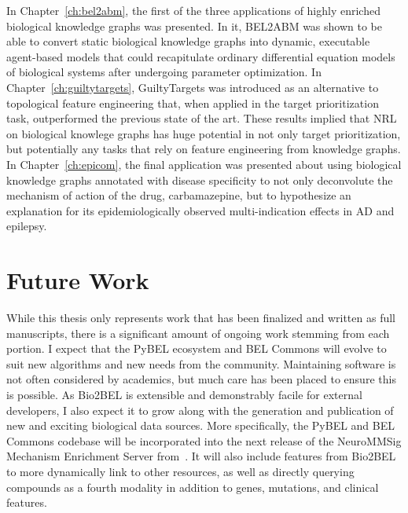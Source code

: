 In Chapter~\ref{ch:bel2abm}, the first of the three applications of highly enriched biological knowledge graphs was presented.
In it, BEL2ABM was shown to be able to convert static biological knowledge graphs into dynamic, executable agent-based models that could recapitulate ordinary differential equation models of biological systems after undergoing parameter optimization.
In Chapter~\ref{ch:guiltytargets}, GuiltyTargets was introduced as an alternative to topological feature engineering that, when applied in the target prioritization task, outperformed the previous state of the art.
These results implied that \ac{NRL} on biological knowlege graphs has huge potential in not only target prioritization, but potentially any tasks that rely on feature engineering from knowledge graphs.
In Chapter~\ref{ch:epicom}, the final application was presented about using biological knowledge graphs annotated with disease specificity to not only deconvolute the mechanism of action of the drug, carbamazepine, but to hypothesize an explanation for its epidemiologically observed multi-indication effects in \ac{AD} and epilepsy.

\section{Future Work}

While this thesis only represents work that has been finalized and written as full manuscripts, there is a significant amount of ongoing work stemming from each portion.
I expect that the PyBEL ecosystem and BEL Commons will evolve to suit new algorithms and new needs from the community.
Maintaining software is not often considered by academics, but much care has been placed to ensure this is possible.
As Bio2BEL is extensible and demonstrably facile for external developers, I also expect it to grow along with the generation and publication of new and exciting biological data sources.
More specifically, the PyBEL and BEL Commons codebase will be incorporated into the next release of the NeuroMMSig Mechanism Enrichment Server from~\cite{Domingo-Fernandez2017}.
It will also include features from Bio2BEL to more dynamically link to other resources, as well as directly querying compounds as a fourth modality in addition to genes, mutations, and clinical features.


